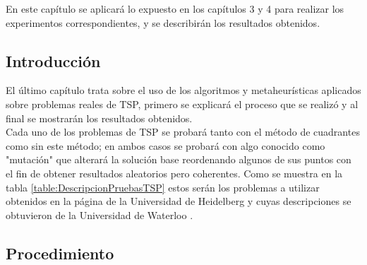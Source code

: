 En este capítulo se aplicará lo expuesto en los capítulos 3 y 4 para realizar los experimentos correspondientes, y se describirán los resultados obtenidos.

\subsection{Introducción}
    
El último capítulo trata sobre el uso de los algoritmos y metaheurísticas aplicados sobre problemas reales de TSP, primero se explicará el proceso que se realizó y al final se mostrarán los resultados obtenidos.\\
\hspace*{1cm}Cada uno de los problemas de TSP se probará tanto con el método de cuadrantes como sin este método; en ambos casos se probará con algo conocido como "mutación" que alterará la solución base reordenando algunos de sus puntos con el fin de obtener resultados aleatorios pero coherentes. Como se muestra en la tabla \ref {table:DescripcionPruebasTSP} estos serán los problemas a utilizar obtenidos en la página de la Universidad de Heidelberg \cite {[TSPLIB]} y cuyas descripciones se obtuvieron de la Universidad de Waterloo \cite{[TSPLIB2]}.

 

\subsection{Procedimiento}

